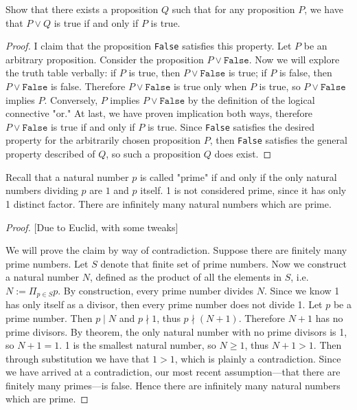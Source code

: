 \documentclass[12pt]{article}
\newcommand{\lean}[1]{\texttt{#1}}
\newenvironment{ex}[2][Problem]{\begin{trivlist}
\item[\hskip \labelsep {\bfseries #1}\hskip \labelsep {\bfseries #2.}]}{\end{trivlist}}
\begin{document}

\begin{ex}{1} [Problem 9 from HW01.lean]
    Show that there exists a proposition $Q$ such that for any proposition $P$, we have that
    $P\vee Q$ is true if and only if $P$ is true.

\end{ex}


\begin{proof}

    I claim that the proposition \lean{False} satisfies this property. Let $P$ be an arbitrary
    proposition. Consider the proposition $P\vee\lean{False}$. Now we will explore the truth table
    verbally: if $P$ is true, then $P\vee\lean{False}$ is true; if $P$ is false, then
    $P\vee\lean{False}$ is false. Therefore $P\vee\lean{False}$ is true only when $P$ is true,
    so $P\vee\lean{False}$ implies $P$. Conversely, $P$ implies $P\vee\lean{False}$ by the definition
    of the logical connective "or." At last, we have proven implication both ways, therefore
    $P\vee\lean{False}$ is true if and only if $P$ is true. Since \lean{False} satisfies the desired
    property for the arbitrarily chosen proposition $P$, then \lean{False} satisfies the general
    property described of $Q$, so such a proposition $Q$ does exist.

\end{proof}

\begin{ex}{2} [Infinitely many primes]

    Recall that a natural number $p$ is called "prime" if and only if the only natural numbers
    dividing $p$ are $1$ and $p$ itself. 1 is not considered prime, since it has only 1 distinct
    factor.
    There are infinitely many natural numbers which are prime.

\end{ex}

\begin{proof}{} [Due to Euclid, with some tweaks]

    We will prove the claim by way of contradiction. Suppose there are finitely many prime
    numbers. Let $S$ denote that finite set of prime numbers. Now we construct a natural number
    $N$, defined as the product of all the elements in $S$, i.e. $N:=\Pi_{p\in S}p$.
    By construction, every prime number divides $N$. Since we know 1 has only itself as
    a divisor, then every prime number does not divide 1. Let $p$ be a prime number.
    Then $p\mid N$ and $p\nmid 1$, thus $p\nmid (N+1)$. Therefore $N+1$ has no prime divisors.
    By theorem, the only natural number with no prime divisors is 1, so $N+1=1$. 1 is the smallest
    natural number, so $N\ge1$, thus $N+1>1$. Then through substitution we have that $1>1$,
    which is plainly a contradiction. Since we have arrived at a contradiction, our most recent
    assumption---that there are finitely many primes---is false. Hence there are infinitely
    many natural numbers which are prime.


\end{proof}
\end{document}
